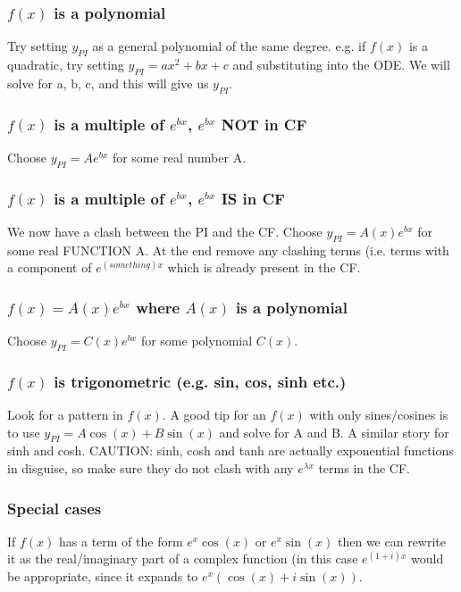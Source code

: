 \documentclass{article}
\begin{document}
\subsubsection{$ f(x) $ is a polynomial}
Try setting $ y_{PI} $ as a general polynomial of the same degree. e.g. if $ f(x) $ is a quadratic, try setting $ y_{PI} = ax^{2} + bx + c $ and substituting into the ODE. We will solve for a, b, c, and this will give us $ y_{PI} $.

\subsubsection{$ f(x) $ is a multiple of $ e^{bx} $, $ e^{bx} $ NOT in CF}
Choose $ y_{PI} = Ae^{bx} $ for some real number A.

\subsubsection{$ f(x) $ is a multiple of $ e^{bx} $, $ e^{bx} $ IS in CF}
We now have a clash between the PI and the CF. Choose $ y_{PI} = A(x)e^{bx} $ for some real FUNCTION A. At the end remove any clashing terms (i.e. terms with a component of $ e^{(something)x} $ which is already present in the CF.

\subsubsection{$ f(x) = A(x)e^{bx} $ where $ A(x) $ is a polynomial}
Choose $ y_{PI} = C(x)e^{bx} $ for some polynomial $ C(x) $.

\subsubsection{$ f(x) $ is trigonometric (e.g. sin, cos, sinh etc.)}
Look for a pattern in $ f(x) $. A good tip for an $ f(x) $ with only sines/cosines is to use $ y_{PI} = A\cos(x) + B\sin(x) $ and solve for A and B. A similar story for sinh and cosh.
CAUTION: sinh, cosh and tanh are actually exponential functions in disguise, so make sure they do not clash with any $ e^{\lambda x} $ terms in the CF.

\subsubsection{Special cases}
If $ f(x) $ has a term of the form $ e^{x}\cos(x) $ or $ e^{x}\sin(x) $ then we can rewrite it as the real/imaginary part of a complex function (in this case $ e^{(1+i)x} $ would be appropriate, since it expands to $ e^{x}(\cos(x) + i\sin(x)) $.
  
\end{document}
